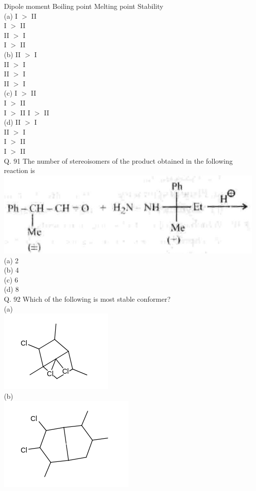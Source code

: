 \documentclass[10pt]{article}
\begin{document}
Dipole moment Boiling point Melting point Stability\\
(a) I $>$ II\\
I $>$ II\\
II $>$ I\\
I $>$ II\\
(b) II $>$ I\\
II $>$ I\\
II $>$ I\\
II $>$ I\\
(c) I $>$ II\\
I $>$ II\\
I $>$ II I $>$ II\\
(d) II $>$ I\\
II $>$ I\\
I $>$ II\\
I $>$ II\\
Q. 91 The number of stereoisomers of the product obtained in the following reaction is\\
\includegraphics[max width=\textwidth, center]{2025_01_28_8470952b98110cec3aabg-139}\\
(a) 2\\
(b) 4\\
(c) 6\\
(d) 8\\
Q. 92 Which of the following is most stable conformer?\\
(a)\\
\includegraphics{smile-77631ad2a38efb5c8bfd492ae23ae8fc2bb6121d}\\
(b)\\
\includegraphics{smile-de9a0bb6cfd31ae0ca5e4e957484d9fcb3b13144}\\
\end{document}
